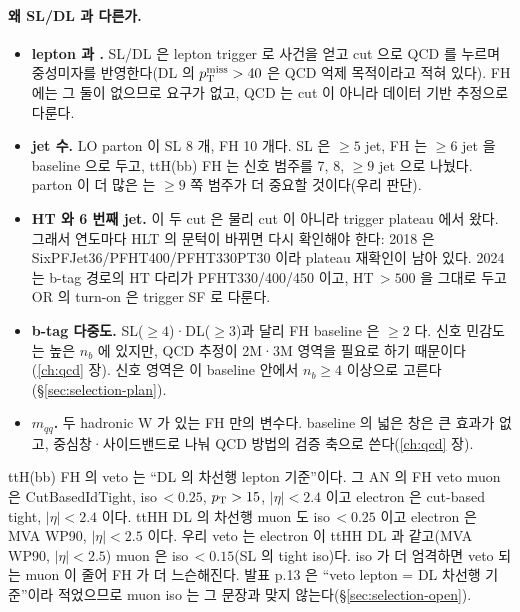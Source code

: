 \paragraph{왜 SL/DL 과 다른가.}
\begin{itemize}
\item \textbf{lepton 과 \MET.} SL/DL 은 lepton trigger 로 사건을 얻고 \MET{} cut 으로 QCD 를 누르며 중성미자를 반영한다(DL 의 $p_{\mathrm{T}}^{\mathrm{miss}}>40$ 은 QCD
      억제 목적이라고 적혀 있다). FH 에는 그 둘이 없으므로 \MET{} 요구가 없고, QCD 는 cut 이 아니라
      데이터 기반 추정으로 다룬다.
\item \textbf{jet 수.} LO parton 이 SL 8 개, FH 10 개다. SL 은 $\ge5$ jet, FH 는 $\ge6$ jet 을 baseline 으로 두고, ttH(bb) FH 는 신호 범주를 7, 8,
      $\ge9$ jet 으로 나눴다. parton 이 더 많은 \ttHH{} 는 $\ge9$ 쪽 범주가 더 중요할 것이다(우리 판단).
\item \textbf{HT 와 6 번째 jet.} 이 두 cut 은 물리 cut 이 아니라 trigger plateau 에서 왔다. 그래서 연도마다 HLT 의 문턱이 바뀌면 다시 확인해야 한다:
      2018 은 SixPFJet36/PFHT400/PFHT330PT30 이라 plateau 재확인이 남아 있다. 2024 는 b-tag 경로의 HT 다리가
      PFHT330/400/450 이고, HT\,$>500$ 을 그대로 두고 OR 의 turn-on 은 trigger SF 로 다룬다.
\item \textbf{b-tag 다중도.} SL($\ge4$)·DL($\ge3$)과 달리 FH baseline 은 $\ge2$ 다. 신호 민감도는 높은 $n_b$ 에 있지만, QCD 추정이 2M·3M 영역을
      필요로 하기 때문이다(\ref{ch:qcd} 장). 신호 영역은 이 baseline 안에서 $n_b\ge4$ 이상으로 고른다(\S\ref{sec:selection-plan}).
\item \textbf{$m_{qq}$.} 두 hadronic W 가 있는 FH 만의 변수다. baseline 의 넓은 창은 큰 효과가 없고, 중심창·사이드밴드로 나눠 QCD 방법의 검증 축으로
      쓴다(\ref{ch:qcd} 장).
\end{itemize}

\begin{andiff}
ttH(bb) FH 의 veto 는 ``DL 의 차선행 lepton 기준''이다. 그 AN 의 FH veto muon 은 CutBasedIdTight,
iso\,$<0.25$, $p_{\mathrm{T}}>15$, $|\eta|<2.4$ 이고 electron 은 cut-based tight, $|\eta|<2.4$ 이다. ttHH DL 의 차선행
muon 도 iso\,$<0.25$ 이고 electron 은 MVA WP90, $|\eta|<2.5$ 이다. 우리 veto 는 electron 이
ttHH DL 과 같고(MVA WP90, $|\eta|<2.5$) muon 은 iso\,$<0.15$(SL 의 tight iso)다. iso 가 더
엄격하면 veto 되는 muon 이 줄어 FH 가 더 느슨해진다. 발표 p.13 은 ``veto lepton = DL 차선행 기준''이라 적었으므로 muon iso 는 그 문장과
맞지 않는다(\S\ref{sec:selection-open}).
\end{andiff}

